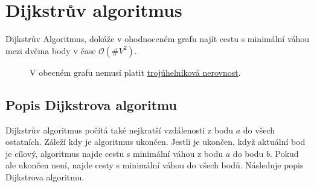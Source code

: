 \chapter{Dijkstrův algoritmus}
\label{appendix:dijkstra}

Dijkstrův Algoritmus, dokáže v ohodnoceném grafu najít cestu s minimální váhou mezi dvěma body v čase $ \mathcal{O}(\#V^2)$. \autocite{benlFormalCorrectnessProofs1999} 

\begin{figure}[H]
  \centering
  \caption{V obecném grafu nemusí platit \hyperref[tvrzeni:trojuhelnikova_nerovnost]{trojúhelníková nerovnost}.}
  \label{obr:troj_ner_graf_2}
\end{figure}


\section{Popis Dijkstrova algoritmu}
\label{subsec:popis-algoritmu}
Dijkstrův algoritmus počítá také nejkratší vzdálenosti z bodu $a$ do všech ostatních. Záleží kdy je algoritmus ukončen. Jestli je ukončen, když aktuální bod je cílový, algoritmus najde cestu s minimální váhou z bodu $a$ do bodu $b$. Pokud ale ukončen není, najde cesty s minimální váhou do všech bodů. Následuje popis Dijkstrova algoritmu.

